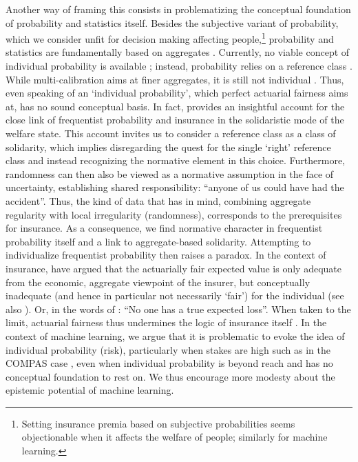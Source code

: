 \documentclass[11pt]{article} %
\begin{document}
Another way of framing this consists in problematizing the conceptual foundation of probability and statistics itself. Besides the subjective variant of probability, which we consider unfit for decision making affecting people,\footnote{Setting insurance premia based on subjective probabilities seems objectionable when it affects the welfare of people; similarly for machine learning.} probability and statistics are fundamentally based on aggregates \citep{desrosieres1998politics}. Currently, no viable concept of individual probability is available \citep{dawid2017individual}; instead, probability relies on a reference class \citep{Reichenbach1949-REITTO-3,hajek2007reference}. While multi-calibration aims at finer aggregates, it is still not individual \citep{dawid2017individual}. Thus, even speaking of an `individual probability', which perfect actuarial fairness aims at, has no sound conceptual basis. 
In fact, \citet[Chapter 4]{friedman2020probable} provides an insightful account for the close link of frequentist probability and insurance in the solidaristic mode of the welfare state. This account invites us to consider a reference class as a class of solidarity, which implies disregarding the quest for the single `right' reference class and instead recognizing the normative element in this choice. Furthermore, randomness can then also be viewed as a normative assumption in the face of uncertainty, establishing shared responsibility: ``anyone of us could have had the accident''. Thus, the kind of data that \citet{Venn1876} has in mind, combining aggregate regularity with local irregularity (randomness), corresponds to the prerequisites for insurance. As a consequence, we find normative character in frequentist probability itself and a link to aggregate-based solidarity.
Attempting to individualize frequentist probability then raises a paradox.
In the context of insurance, \citet{frezal2020fairness} have argued that the actuarially fair expected value is only adequate from the economic, aggregate viewpoint of the insurer, but conceptually inadequate (and hence in particular not necessarily `fair') for the individual (see also \citep{frezal2016}). Or, in the words of \citet{abraham1985efficiency}: ``No one has a true expected loss''. When taken to the limit, actuarial fairness thus undermines the logic of insurance itself \citep{martinez2016fair}. In the context of machine learning, we argue that it is problematic to evoke the idea of individual probability (risk), particularly when stakes are high such as in the COMPAS case \citep{machinebias}, even when individual probability is beyond reach and has no conceptual foundation to rest on. We thus encourage more modesty about the epistemic potential of machine learning.
\end{document}
